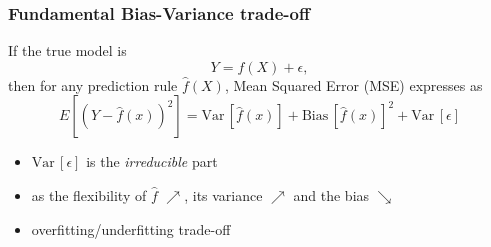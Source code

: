 \message{ !name(intro.tex)}\documentclass[pressentation,9pt,aspectratio=1610,xcolor=table]{beamer}
\newcommand{\doigtr}{\alert{\noindent \Pisymbol{pzd}{43}}}
\begin{document}
\begin{frame}
  \frametitle{Fundamental Bias-Variance trade-off}
  If the true model is 
  $$ Y= f(X) + \epsilon,$$
  then for any prediction rule $\widehat{f}(X)$, 
  Mean Squared Error (MSE) expresses as
  $$
  E\left[ \left(Y- \widehat{f}(x) \right)^2 \right] = 
  \textrm{Var}\, \left[ \widehat{f}(x) \right] +  \textrm{Bias}\, \left[ \widehat{f}(x) \right]^2 + \textrm{Var}\, \left[ \epsilon \right] 
  $$
  \begin{itemize}
   \item $ \textrm{Var}\, \left[ \epsilon \right] $ is the {\em irreducible} part
  \end{itemize}
  \begin{itemize}
     \item as the flexibility of $\widehat{f}$ $\nearrow$, its variance $\nearrow$ and the bias $\searrow$
     \item[\doigtr] \alert{overfitting/underfitting trade-off}
  \end{itemize}
\end{frame}
\end{document}
